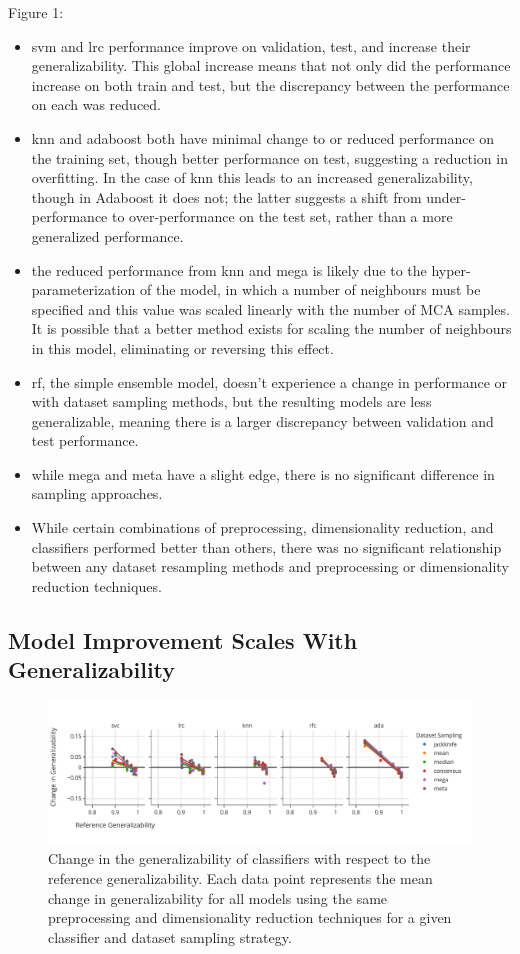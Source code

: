 \documentclass[10pt]{SelfArx} %
\begin{document}
Figure 1:
\begin{itemize}
\item svm and lrc performance improve on validation, test, and increase their generalizability. This global increase
means that not only did the performance increase on both train and test, but the discrepancy between the performance
on each was reduced.
\item knn and adaboost both have minimal change to or reduced performance on the training set, though better
performance on test, suggesting a reduction in overfitting. In the case of knn this leads to an increased
generalizability, though in Adaboost it does not; the latter suggests a shift from under-performance to
over-performance on the test set, rather than a more generalized performance.
\item the reduced performance from knn and mega is likely due to the hyper-parameterization of the model, in which a
number of neighbours must be specified and this value was scaled linearly with the number of MCA samples. It is
possible that a better method exists for scaling the number of neighbours in this model, eliminating or reversing this
effect.
\item rf, the simple ensemble model, doesn't experience a change in performance or with dataset sampling methods, but
the resulting models are less generalizable, meaning there is a larger discrepancy between validation and test
performance.
\item while mega and meta have a slight edge, there is no significant difference in sampling approaches.
\item While certain combinations of preprocessing, dimensionality reduction, and classifiers performed better than
others, there was no significant relationship between any dataset resampling methods and preprocessing or
dimensionality reduction techniques.
\end{itemize}

\subsection*{Model Improvement Scales With Generalizability}
\begin{figure}[bht!]\centering
\includegraphics[width=\linewidth]{figures/2.pdf}
\caption{Change in the generalizability of classifiers with respect to the reference generalizability. Each data point
represents the mean change in generalizability for all models using the same preprocessing and dimensionality
reduction techniques for a given classifier and dataset sampling strategy.}
\label{fig:change_in_gen}
\end{figure}
\end{document}
